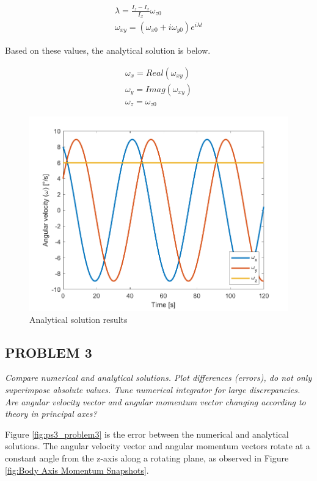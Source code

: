 \begin{align*}
    \lambda = \frac{I_z - I_x}{I_x} \omega_{z0} \\
    \omega_{xy} = (\omega_{x0} + i \omega_{y0}) e^{i \lambda t}
\end{align*}

Based on these values, the analytical solution is below.

\begin{align*}
    \omega_x = Real(\omega_{xy}) \\
    \omega_y = Imag(\omega_{xy}) \\ 
    \omega_z = \omega_{z0}
\end{align*}


\begin{figure}[H]
\centering
\includegraphics[scale=0.6]{Images/ps3_problem2.png}
\caption{Analytical solution results}
\label{fig:ps3_problem2}
\end{figure}


\subsection{PROBLEM 3}
\textit{Compare numerical and analytical solutions. Plot differences (errors), do not only superimpose absolute values. Tune numerical integrator for large discrepancies. Are angular velocity vector and angular momentum vector changing according to theory in principal axes?}

Figure \ref{fig:ps3_problem3} is the error between the numerical and analytical solutions. The angular velocity vector and angular momentum vectors rotate at a constant angle from the z-axis along a rotating plane, as observed in Figure \ref{fig:Body Axis Momentum Snapshots}.

